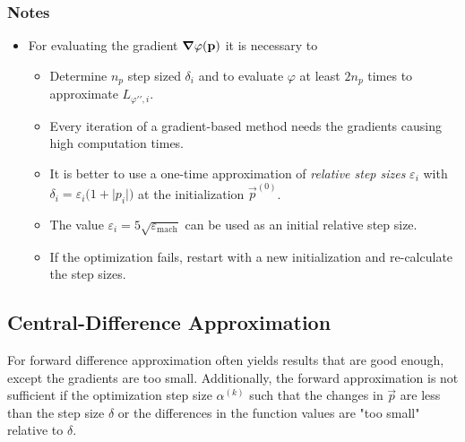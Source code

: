 			\subsubsection{Notes}
				\begin{itemize}
					\item For evaluating the gradient \( \grad{\varphi}(\boldsymbol{\mathrm{p}}) \) it is necessary to
						\begin{itemize}
							\item Determine \(n_p\) step sized \(\delta_i\) and to evaluate \(\varphi\) at least \( 2n_p \) times to approximate \( L_{\varphi\prime\prime, i} \).
							\item Every iteration of a gradient-based method needs the gradients causing high computation times.
							\item It is better to use a one-time approximation of \emph{relative step sizes} \( \varepsilon_i \) with \( \delta_i = \varepsilon_i \big(1 + \lvert p_i \rvert\big) \) at the initialization \(\vec{p}^{(0)}\).
							\item The value \( \varepsilon_i = 5 \sqrt{\varepsilon_\mathrm{mach}} \) can be used as an initial relative step size.
							\item If the optimization fails, restart with a new initialization and re-calculate the step sizes.
						\end{itemize}
				\end{itemize}

		\subsection{Central-Difference Approximation}
			For forward difference approximation often yields results that are good enough, except the gradients are too small. Additionally, the forward approximation is not sufficient if the optimization step size \( \alpha^{(k)} \) such that the changes in \( \vec{p} \) are less than the step size \(\delta\) or the differences in the function values are "too small" relative to \(\delta\).
			

